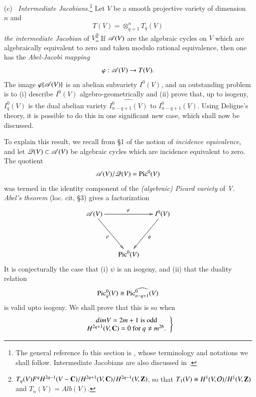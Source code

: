 \noindent
(c)~ \textit{Intermediate Jacobians.}\footnote[24]{The general reference fo this section is \cite{art4-key22}, whose terminology and notations we shall follow. Intermediate Jacobians are also discussed in \cite{art4-key36}.} Let $V$ be a smooth projective variety of dimension $n$ and
$$
T (V) = \otimes^n_{q=1} T_q (V)
$$
\textit{the intermediate Jacobian} of $V$\footnote[25]{$T_q (V) F^q H^{2q-1} (V-\mathbf{C}) / H^{2q+1} (V, \mathbf{C}) / H^{2q-1} (V, \mathbf{Z})$, so that $T_1 (V) \cong H^1 (V, \mathcal{O})/ H^1 (V,\mathbf{Z})$ and $T_{n}(V) = Alb (V)$.} If $\mathscr{A} (V)$ are the algebraic cycles on $V$ which are algebraically equivalent to zero and taken modulo rational equivalence, then one has the \textit{Abel-Jacobi mapping}
$$
\varphi : \mathscr{A} (V) \to T (V).
$$
The image $\varphi \{\mathscr{A} (V)\}$ is an abelian subvariety $I^0(V)$, and an outstanding problem is to (i) describe $I^0(V)$ algebro-geometrically and (ii) prove that, up to isogeny, $I^0_q (V)$ is the dual abelian variety $\widehat{I^0_{n-q+1} (V)}$ to $I^0_{n-q+1} (V)$. Using Deligne's theory, it is possible to do this in one significant new case, which shall now be discussed.

To explain this result, we recall from \S 1 of \cite{art4-key22} the notion of \textit{incidence equivalence}, and let $\mathscr{Q} (V) \subset \mathscr{A} (V)$ be algebraic cycles which are incidence equivalent to zero. The quotient
$$
\mathscr{A} (V)/ \mathscr{Q} (V) = \operatorname{Pic}^0 (V)
$$
was termed in \cite{art4-key22} the identity component of the \textit{(algebraic) Picard variety} of \textit{V. Abel's theorem} (loc. cit, \S 3) gives a factorization
\setcounter{equation}{6}
\begin{equation}
\vcenter{
\xymatrix@R=1.5cm@C=.6cm{ 
\sA(V) \ar[rr]^\varphi \ar[dr]_-{\rho} && I^{0}(V) \ar[dl]^-{\psi}\\
& \Pic^0(V) &}}\label{art4-eq6.7}
\end{equation}
It is conjecturally the case that (i) $\psi$ is an isogeny, and (ii) that the duality relation
\setcounter{equation}{7}
\begin{equation}\label{art4-eq6.8}
\operatorname{Pic}^0_q (V) \cong \widehat{\operatorname{Pic}^0_{n-q+1} (V)}
\end{equation}
is valid upto isogeny. We shall prove that this is so when
\begin{equation}
\left.
\begin{array}{c}
dim V = 2 m +1 \text{ is odd}\\
H^{2q+1} (V, \bC) = 0 \text{ for } q \neq m\footnotemark[26]{} .
\end{array}
\right\}\label{art4-eq6.9}
\end{equation}\pageoriginale

